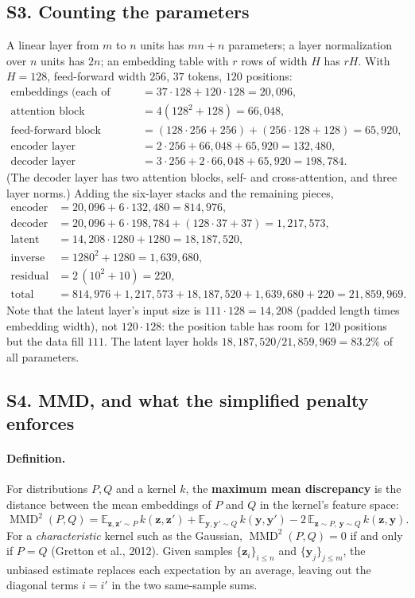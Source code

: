 \documentclass[11pt]{article}
\newcommand{\E}{\mathbb{E}}
\DeclareMathOperator{\MMD}{MMD}
\begin{document}
\subsection*{S3. Counting the parameters}
A linear layer from $m$ to $n$ units has $mn+n$ parameters; a layer normalization over $n$ units has $2n$; an embedding table with $r$ rows of width $H$ has $rH$. With $H=128$, feed-forward width $256$, $37$ tokens, $120$ positions:
\begin{align*}
  \text{embeddings (each of enc., dec.)} &= 37\cdot128+120\cdot128=20{,}096,\\
  \text{attention block} &= 4(128^2+128)=66{,}048,\\
  \text{feed-forward block} &= (128\cdot256+256)+(256\cdot128+128)=65{,}920,\\
  \text{encoder layer} &= 2\cdot256+66{,}048+65{,}920=132{,}480,\\
  \text{decoder layer} &= 3\cdot256+2\cdot66{,}048+65{,}920=198{,}784 .
\end{align*}
(The decoder layer has two attention blocks, self- and cross-attention, and three layer norms.) Adding the six-layer stacks and the remaining pieces,
\begin{align*}
  \text{encoder}&=20{,}096+6\cdot132{,}480=814{,}976,\\
  \text{decoder}&=20{,}096+6\cdot198{,}784+(128\cdot37+37)=1{,}217{,}573,\\
  \text{latent layer}&=14{,}208\cdot1280+1280=18{,}187{,}520,\\
  \text{inverse layer}&=1280^2+1280=1{,}639{,}680,\\
  \text{residual blocks}&=2\,(10^2+10)=220,\\
  \text{total}&=814{,}976+1{,}217{,}573+18{,}187{,}520+1{,}639{,}680+220=21{,}859{,}969 .
\end{align*}
Note that the latent layer's input size is $111\cdot128=14{,}208$ (padded length times embedding width), not $120\cdot128$: the position table has room for $120$ positions but the data fill $111$. The latent layer holds $18{,}187{,}520/21{,}859{,}969=83.2\%$ of all parameters.

\label{sec:S4}
\subsection*{S4. MMD, and what the simplified penalty enforces}
\paragraph{Definition.} For distributions $P,Q$ and a kernel $k$, the \textbf{maximum mean discrepancy} is the distance between the mean embeddings of $P$ and $Q$ in the kernel's feature space:
\[
  \MMD^2(P,Q)=\E_{\bm z,\bm z'\sim P}\,k(\bm z,\bm z')+\E_{\bm y,\bm y'\sim Q}\,k(\bm y,\bm y')-2\,\E_{\bm z\sim P,\ \bm y\sim Q}\,k(\bm z,\bm y).
\]
For a \emph{characteristic} kernel such as the Gaussian, $\MMD^2(P,Q)=0$ if and only if $P=Q$ (Gretton et al., 2012). Given samples $\{\bm z_i\}_{i\le n}$ and $\{\bm y_j\}_{j\le m}$, the unbiased estimate replaces each expectation by an average, leaving out the diagonal terms $i=i'$ in the two same-sample sums.
\end{document}
